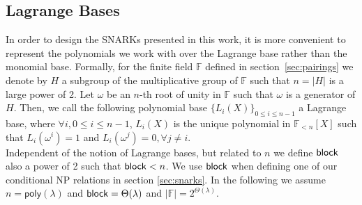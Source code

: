 \subsection{Lagrange Bases}
\label{sec:lagrange}

In order to design the SNARKs presented in this work, it is more convenient to represent the polynomials 
we work with over the Lagrange base rather than the monomial base. Formally, for the finite field $\mathbb{F}$ defined in section~\ref{sec:pairings} 
we denote by $H$ a subgroup of the multiplicative group of $\mathbb{F}$ such that $n = |H|$ is a large power of 2. Let $\omega$ be an $n$-th 
root of unity in $\mathbb{F}$ such that $\omega$ is a generator of $H$. Then, we call the following polynomial base $\{L_i(X)\} _{0 \leq i\leq n-1}$ 
a Lagrange base, where $\forall i, 0 \leq i \leq n-1$, $L_i(X)$ is the unique polynomial in $\mathbb{F}_{<n}[X]$ such that 
$L_i(\omega^i) =1$ and $L_i(\omega^j) = 0, \forall j \neq i$.\\

\noindent Independent of the notion of Lagrange bases, but related to $n$ we define $\mathsf{block}$ also a power of 2 such that $\mathsf{block} < n$. 
We use $\mathsf{block}$ when defining one of our conditional NP relations in section \ref{sec:snarks}. In the following we assume 
$n = \mathsf{poly} (\lambda)$ and $\mathsf{block} = \Theta(\lambda)$ and $|\mathbb{F}|= 2^{\Theta(\lambda)}$.%

 

